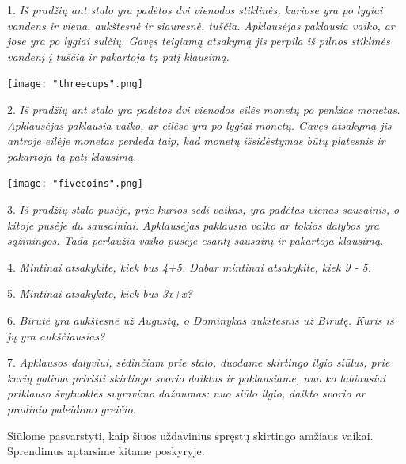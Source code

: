 \documentclass{article}
\begin{document}
\begin{minipage}[b]{0.73\linewidth} 1. \textit{Iš pradžių ant stalo yra padėtos dvi vienodos stiklinės, kuriose yra po lygiai vandens ir viena, aukštesnė ir siauresnė, tuščia. Apklausėjas paklausia vaiko, ar jose yra po lygiai sulčių. Gavęs teigiamą atsakymą jis perpila iš pilnos stiklinės vandenį į tuščią ir pakartoja tą patį klausimą.} \end{minipage} \hspace{\fill} \begin{minipage}[b]{0.25\linewidth}\texttt{[image: "threecups".png]} \end{minipage}\newline

\begin{minipage}[b]{0.79\linewidth} 2. \textit{Iš pradžių ant stalo yra padėtos dvi vienodos eilės monetų po penkias monetas. Apklausėjas paklausia vaiko, ar eilėse yra po lygiai monetų. Gavęs atsakymą jis antroje eilėje monetas perdeda taip, kad monetų išsidėstymas būtų platesnis ir pakartoja tą patį klausimą.} \end{minipage} \hspace{\fill} \begin{minipage}[b]{0.2\linewidth}\texttt{[image: "fivecoins".png]} \end{minipage}\newline

3. \textit{Iš pradžių stalo pusėje, prie kurios sėdi vaikas, yra padėtas vienas sausainis, o kitoje pusėje du sausainiai. Apklausėjas paklausia vaiko ar tokios dalybos yra sąžiningos. Tada perlaužia vaiko pusėje esantį sausainį ir pakartoja klausimą.}

4. \textit{Mintinai atsakykite, kiek bus 4+5. Dabar mintinai atsakykite, kiek 9 - 5.}\newline

5. \textit{Mintinai atsakykite, kiek bus 3x+x?}

6. \textit{Birutė yra aukštesnė už Augustą, o Dominykas aukštesnis už Birutę. Kuris iš jų yra aukščiausias?}

7. \textit{Apklausos dalyviui, sėdinčiam prie stalo, duodame skirtingo ilgio siūlus, prie kurių galima pririšti skirtingo svorio daiktus ir paklausiame, nuo ko labiausiai priklauso švytuoklės svyravimo dažnumas: nuo siūlo ilgio, daikto svorio ar pradinio paleidimo greičio.}\newline

Siūlome pasvarstyti, kaip šiuos uždavinius spręstų skirtingo amžiaus vaikai. Sprendimus aptarsime kitame poskyryje.
\end{document}

